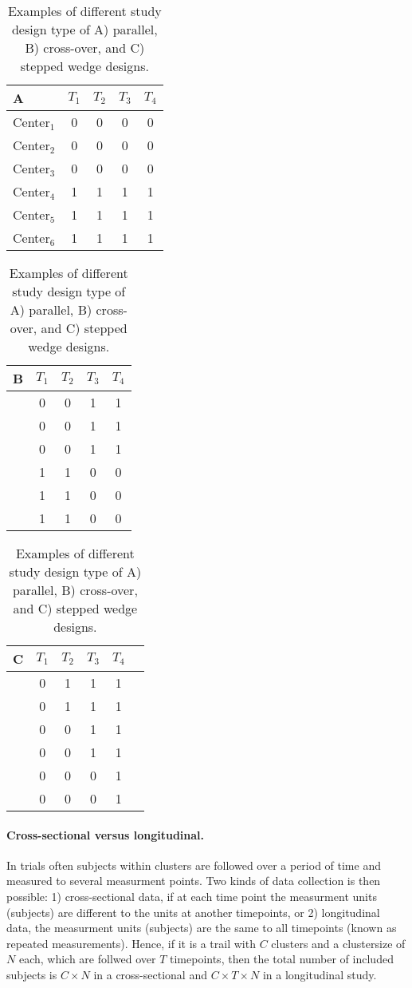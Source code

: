 \documentclass{article}
\begin{document}
\begin{table}[!ht]
\begin{tabular}{l|cccc}  
\textbf{A} &$T_1$ & $T_2$&$T_3$ &$T_4$\\
\midrule
 Center$_1$&0&0&0&0\\
 Center$_2$&0&0&0&0\\
 Center$_3$&0&0&0&0\\
 Center$_4$&1&1&1&1\\
 Center$_5$&1&1&1&1\\
 Center$_6$&1&1&1&1\\
\bottomrule
\end{tabular}
\hfill
\begin{tabular}{l|cccc}  
\textbf{B} &$T_1$ & $T_2$&$T_3$ &$T_4$\\
\midrule
&0&0&1&1\\
&0&0&1&1\\
&0&0&1&1\\
&1&1&0&0\\
&1&1&0&0\\
&1&1&0&0\\
\bottomrule
\end{tabular}
\hfill
\begin{tabular}{l|ccccc}  
\textbf{C} &$T_1$ & $T_2$&$T_3$  &$T_4$  \\
\midrule
&0&1&1&1\\
&0&1&1&1\\
&0&0&1&1\\
&0&0&1&1\\
&0&0&0&1\\
&0&0&0&1\\
\bottomrule
\end{tabular}
\caption{Examples of different study design type of A) parallel, B) cross-over, and C) stepped wedge designs.}
\label{Tab.Studytype}
\end{table}

\paragraph{Cross-sectional versus longitudinal.}

In trials often subjects within clusters are followed over a period of time and measured to several measurment points. Two kinds of data collection is then possible: 1) cross-sectional data, if at each time point the measurment units (subjects) are different to the units at another timepoints, or 2) longitudinal data, the measurment units (subjects) are the same to all timepoints (known as repeated measurements). Hence, if it is a trail with $C$ clusters and a clustersize of $N$ each, which are follwed over $T$ timepoints, then the total number of included subjects is $C\times N$ in a cross-sectional and $C\times T\times N$ in a longitudinal study.
\end{document}
